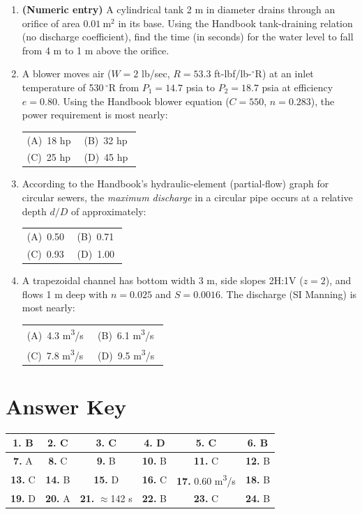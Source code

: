 \documentclass[11pt]{article}
\makeatletter
\newcommand{\opts}[4]{%
\par\nobreak\vspace{3pt}%
\noindent\begin{tabular}{@{}p{0.47\linewidth}p{0.47\linewidth}@{}}
(A)~#1 & (B)~#2 \\[3pt]
(C)~#3 & (D)~#4 \\
\end{tabular}\par\vspace{3pt}}
\makeatother
\begin{document}
\begin{enumerate}[leftmargin=1.6em,itemsep=8pt]
\item \textbf{(Numeric entry)} A cylindrical tank 2 m in diameter drains through an orifice of area $0.01~\mathrm{m^2}$ in its base. Using the Handbook tank-draining relation (no discharge coefficient), find the time (in seconds) for the water level to fall from 4 m to 1 m above the orifice.

\item A blower moves air ($W=2$ lb/sec, $R=53.3$ ft-lbf/lb-$^{\circ}$R) at an inlet temperature of 530\,$^{\circ}$R from $P_1=14.7$ psia to $P_2=18.7$ psia at efficiency $e=0.80$. Using the Handbook blower equation ($C=550$, $n=0.283$), the power requirement is most nearly:
\opts{18 hp}{32 hp}{25 hp}{45 hp}

\item According to the Handbook's hydraulic-element (partial-flow) graph for circular sewers, the \emph{maximum discharge} in a circular pipe occurs at a relative depth $d/D$ of approximately:
\opts{0.50}{0.71}{0.93}{1.00}

\item A trapezoidal channel has bottom width 3 m, side slopes 2H:1V ($z=2$), and flows 1 m deep with $n=0.025$ and $S=0.0016$. The discharge (SI Manning) is most nearly:
\opts{4.3 m\textsuperscript{3}/s}{6.1 m\textsuperscript{3}/s}{7.8 m\textsuperscript{3}/s}{9.5 m\textsuperscript{3}/s}

\end{enumerate}

\newpage
\section*{\color{titleblue}Answer Key}
\vspace{4pt}
\noindent\colorbox{keybg}{%
\begin{minipage}{0.97\linewidth}
\vspace{5pt}
\renewcommand{\arraystretch}{1.4}
\begin{center}
\begin{tabular}{|c|c|c|c|c|c|}
\hline
\textbf{1.} B & \textbf{2.} C & \textbf{3.} C & \textbf{4.} D & \textbf{5.} C & \textbf{6.} B \\ \hline
\textbf{7.} A & \textbf{8.} C & \textbf{9.} B & \textbf{10.} B & \textbf{11.} C & \textbf{12.} B \\ \hline
\textbf{13.} C & \textbf{14.} B & \textbf{15.} D & \textbf{16.} C & \textbf{17.} 0.60 m\textsuperscript{3}/s & \textbf{18.} B \\ \hline
\textbf{19.} D & \textbf{20.} A & \textbf{21.} $\approx$142 s & \textbf{22.} B & \textbf{23.} C & \textbf{24.} B \\ \hline
\end{tabular}
\end{center}
\vspace{4pt}
\end{minipage}}
\end{document}
